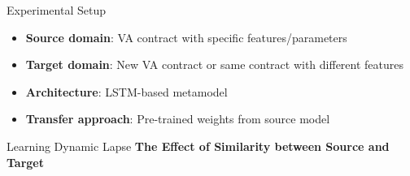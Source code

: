     \begin{frame}{Experimental Setup}
    \begin{itemize}
        \item \textbf{Source domain}: VA contract with specific features/parameters
        \item \textbf{Target domain}: New VA contract or same contract with different features
        \item \textbf{Architecture}: LSTM-based metamodel
        \item \textbf{Transfer approach}: Pre-trained weights from source model
    \end{itemize}
    \end{frame}
    
    \begin{frame}{Learning Dynamic Lapse}
    \textbf{The Effect of Similarity between Source and Target}
    \end{frame}
    
